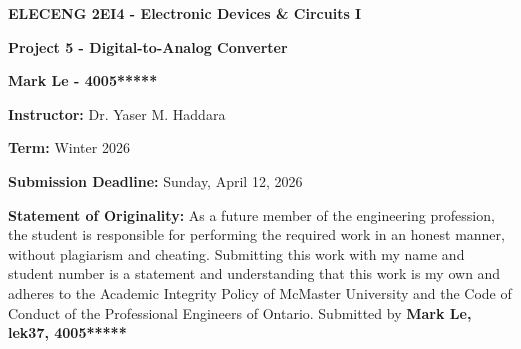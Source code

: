 \documentclass[12pt]{article}
\begin{document}
    
    \begin{titlepage}
    \begin{center}
    \vspace*{\fill}

    {\LARGE \textbf{ELECENG 2EI4 - Electronic Devices \& Circuits I}\par}
    \vspace{2.5cm}

    {\LARGE\bfseries Project 5 - Digital-to-Analog Converter\par}
    \vspace{2.5cm}
    
    {\Large \textbf{Mark Le - 4005*****}\par} %
    \vspace{2.5cm}
    
    {\large \textbf{Instructor:} Dr. Yaser M. Haddara\par}
    \vspace{0.5cm}
    {\large \textbf{Term:} Winter 2026 \par} %
    \vspace{0.5cm}
    
    {\large \textbf{Submission Deadline:} Sunday, April 12, 2026\par}
    \end{center}

    \vspace*{\fill}

    \textbf{Statement of Originality:} As a future member of the engineering profession, the student is responsible for performing the required work in an honest manner, without plagiarism and cheating. Submitting this work with my name and student number is a statement and understanding that this work is my own and adheres to the Academic Integrity Policy of McMaster University and the Code of Conduct of the Professional Engineers of Ontario. Submitted by \textbf{Mark Le, lek37, 4005*****} %

\end{titlepage}

    \newpage
    \tableofcontents

    \listoffigures

    \listoftables

    \newpage

\end{document}
